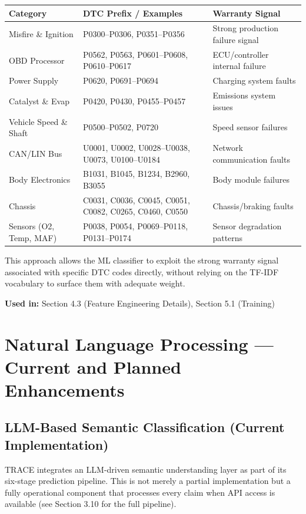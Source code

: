 \documentclass[10pt]{article}
\begin{document}
\begin{table}[h!]
\centering
\begin{tabular}{|p{3.5cm}|p{5cm}|p{4.5cm}|}
\hline
\textbf{Category} & \textbf{DTC Prefix / Examples} & \textbf{Warranty Signal} \\ \hline
Misfire \& Ignition & P0300--P0306, P0351--P0356 & Strong production failure signal \\ \hline
OBD Processor & P0562, P0563, P0601--P0608, P0610--P0617 & ECU/controller internal failure \\ \hline
Power Supply & P0620, P0691--P0694 & Charging system faults \\ \hline
Catalyst \& Evap & P0420, P0430, P0455--P0457 & Emissions system issues \\ \hline
Vehicle Speed \& Shaft & P0500--P0502, P0720 & Speed sensor failures \\ \hline
CAN/LIN Bus & U0001, U0002, U0028--U0038, U0073, U0100--U0184 & Network communication faults \\ \hline
Body Electronics & B1031, B1045, B1234, B2960, B3055 & Body module failures \\ \hline
Chassis & C0031, C0036, C0045, C0051, C0082, C0265, C0460, C0550 & Chassis/braking faults \\ \hline
Sensors (O2, Temp, MAF) & P0038, P0054, P0069--P0118, P0131--P0174 & Sensor degradation patterns \\ \hline
\end{tabular}
\end{table}

This approach allows the ML classifier to exploit the strong warranty signal associated with specific DTC codes directly, without relying on the TF-IDF vocabulary to surface them with adequate weight.

\textbf{Used in:} Section 4.3 (Feature Engineering Details), Section 5.1 (Training)

\section{Natural Language Processing --- Current and Planned Enhancements}

\subsection{LLM-Based Semantic Classification (Current Implementation)}

TRACE integrates an LLM-driven semantic understanding layer as part of its six-stage prediction pipeline. This is not merely a partial implementation but a fully operational component that processes every claim when API access is available (see Section 3.10 for the full pipeline).
\end{document}
